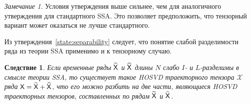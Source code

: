 \documentclass[specialist,
    substylefile = spbu_report.rtx,
    subf,href,colorlinks=true, 12pt]{disser}
\theoremstyle{plain}
\newtheorem{corollary}{Следствие}[statement]
\theoremstyle{definition}
\theoremstyle{remark}
\newtheorem*{remark}{Замечание}
\begin{document}
    \begin{remark}
        Условия утверждения выше сильнее, чем для аналогичного утверждения для стандартного SSA.
        Это позволяет предположить, что тензорный вариант может оказаться не лучше стандартного.
    \end{remark}

    Из утверждения~\ref{state:separability} следует, что понятие слабой разделимости ряда из теории SSA
    применимо и к тензорному случаю.
    \begin{corollary}
        Если временные ряды $\widetilde{\mathsf{X}}$ и $\widehat{\mathsf{X}}$ длины $N$ слабо $I$- и $L$-разделимы 
        в смысле теории \emph{SSA},
        то существует такое \emph{HOSVD} траекторного тензора $\mathcal{X}$ ряда 
        $\mathsf{X}=\widetilde{\mathsf{X}} + \widehat{\mathsf{X}}$, что его можно разбить
        на две части, являющиеся \emph{HOSVD} траекторных тензоров, составленных по рядам 
        $\widetilde{\mathsf{X}}$ и $\widehat{\mathsf{X}}$.
    \end{corollary}
\end{document}
